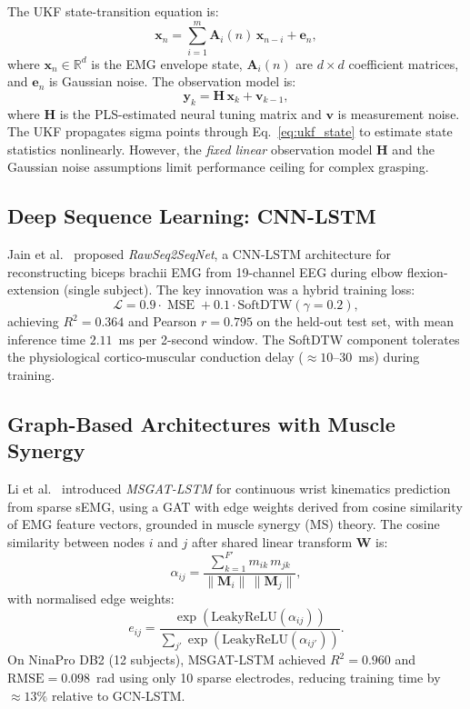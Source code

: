 \documentclass[12pt, a4paper]{article}
\DeclareMathOperator{\MSE}{MSE}
\newcommand{\R}{\mathbb{R}}
\begin{document}
	The UKF state-transition equation is:
	\begin{equation}
		\bm{x}_n = \sum_{i=1}^{m} \bm{A}_i(n)\,\bm{x}_{n-i} + \bm{e}_n,
		\label{eq:ukf_state}
	\end{equation}
	where $\bm{x}_n \in \R^d$ is the EMG envelope state, $\bm{A}_i(n)$ are
	$d\!\times\!d$ coefficient matrices, and $\bm{e}_n$ is Gaussian noise.
	The observation model is:
	\begin{equation}
		\bm{y}_k = \bm{H}\,\bm{x}_k + \bm{v}_{k-1},
		\label{eq:ukf_obs}
	\end{equation}
	where $\bm{H}$ is the PLS-estimated neural tuning matrix and $\bm{v}$ is
	measurement noise. The UKF propagates sigma points through
	Eq.~\eqref{eq:ukf_state} to estimate state statistics nonlinearly.
	However, the \emph{fixed linear} observation model $\bm{H}$ and the
	Gaussian noise assumptions limit performance ceiling for complex grasping.
	
	\subsection{Deep Sequence Learning: CNN-LSTM}
	
	Jain et al.~\cite{jain2025} proposed \textit{RawSeq2SeqNet}, a CNN-LSTM
	architecture for reconstructing biceps brachii EMG from 19-channel EEG during
	elbow flexion-extension (single subject). The key innovation was a hybrid
	training loss:
	\begin{equation}
		\mathcal{L} = 0.9 \cdot \MSE + 0.1 \cdot \mathrm{SoftDTW}(\gamma=0.2),
		\label{eq:jain_loss}
	\end{equation}
	achieving $R^2 = 0.364$ and Pearson $r = 0.795$ on the held-out test set, with
	mean inference time $2.11$~ms per 2-second window. The SoftDTW component
	tolerates the physiological cortico-muscular conduction delay
	($\approx 10$--$30$~ms) during training.
	
	\subsection{Graph-Based Architectures with Muscle Synergy}
	
	Li et al.~\cite{li2025} introduced \textit{MSGAT-LSTM} for continuous wrist
	kinematics prediction from sparse sEMG, using a GAT with edge weights
	derived from cosine similarity of EMG feature vectors, grounded in muscle
	synergy (MS) theory. The cosine similarity between nodes $i$ and $j$ after
	shared linear transform $\bm{W}$ is:
	\begin{equation}
		\alpha_{ij} = \frac{\sum_{k=1}^{F'} m_{ik}\,m_{jk}}
		{\|\bm{M}_i\|\,\|\bm{M}_j\|},
		\label{eq:cosine}
	\end{equation}
	with normalised edge weights:
	\begin{equation}
		e_{ij} = \frac{\exp(\mathrm{LeakyReLU}(\alpha_{ij}))}
		{\sum_{j'} \exp(\mathrm{LeakyReLU}(\alpha_{ij'}))}.
		\label{eq:gat_edge}
	\end{equation}
	On NinaPro DB2 (12 subjects), MSGAT-LSTM achieved $R^2 = 0.960$ and
	$\mathrm{RMSE} = 0.098$~rad using only 10 sparse electrodes, reducing
	training time by $\approx 13\%$ relative to GCN-LSTM.
	
\end{document}
